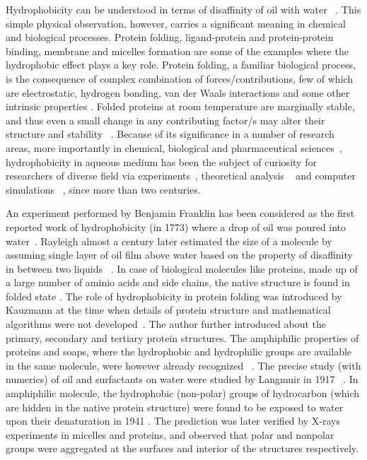 \begin{sloppypar}
Hydrophobicity can be understood in terms of disaffinity of oil with water ~\citep{Southall2002}. This simple physical observation, however, carries a significant meaning in chemical and biological processes. Protein folding, ligand-protein and protein-protein binding, membrane and micelles formation  are some of the examples where the hydrophobic effect plays a key role. Protein folding, a familiar biological process, is the consequence of complex combination of forces/contributions, few of which are electrostatic, hydrogen bonding, van der Waals interactions and some other intrinsic properties \citep{Dill1990}. Folded proteins at room temperature are marginally stable, and thus even a small change in any contributing factor/s may alter their structure and stability ~\citep{Dill1990}. Because of its significance in a number of research areas, more importantly in chemical, biological and pharmaceutical sciences~\citep{Djikaev2016}, hydrophobicity in aqueous medium has been the subject of curiosity for researchers of diverse field via experiments~\citep{Crovetto1982}, theoretical analysis ~\citep{Pratt1980} and computer simulations ~\citep{Guillot1993}, since more than two centuries. 
\end{sloppypar}

An experiment performed by Benjamin Franklin has been considered as the first reported work of hydrophobicity (in 1773) where a drop of oil was poured into water~\citep{Tanford2004}. Rayleigh almost a century later estimated the size of a molecule by assuming single layer of oil film above water based on the property of disaffinity in between two liquids ~\citep{Tanford2004}. In case of biological molecules like proteins, made up of a large number of aminio acids and side chains, the native structure is found in folded state \citep{Tanford1997, Alberts2002}. The role of hydrophobicity in protein folding was introduced by Kauzmann at the time when details of protein structure and mathematical algorithms were not developed~\citep{Kauzmann1959}. The author further introduced about the primary, secondary and tertiary protein structures.  The amphiphilic properties of proteins and soaps, where the hydrophobic and hydrophilic groups are available in the same molecule, were however already recognized ~\citep{Tanford1997}. The precise study (with numerics) of oil and surfactants on water were studied by Langmuir in 1917 ~\citep{Langmuir1917}. In amphiphilic molecule, the hydrophobic (non-polar) groups of hydrocarbon (which are hidden in the native protein structure) were found to be exposed to water upon their denaturation in 1941 \citep{Bull2009}. The prediction was later verified by X-rays experiments in micelles and proteins, and observed that  polar and nonpolar groups were aggregated at the surfaces and interior of the structures respectively.  

